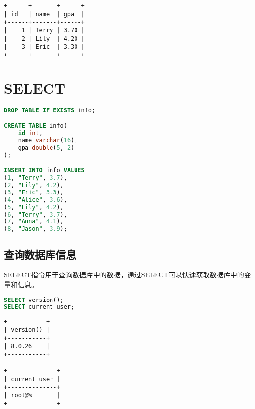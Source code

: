 \documentclass[12pt, openany, oneside]{book}
\begin{document}
\begin{tcolorbox}
	\begin{verbatim}
+------+-------+------+
| id   | name  | gpa  |
+------+-------+------+
|    1 | Terry | 3.70 |
|    2 | Lily  | 4.20 |
|    3 | Eric  | 3.30 |
+------+-------+------+
\end{verbatim}
\end{tcolorbox}

\newpage

\chapter{SELECT}

\vspace{0.5cm}


\begin{lstlisting}[language=SQL]
DROP TABLE IF EXISTS info;

CREATE TABLE info(
    id int,
    name varchar(16),
    gpa double(5, 2)
);

INSERT INTO info VALUES
(1, "Terry", 3.7),
(2, "Lily", 4.2),
(3, "Eric", 3.3),
(4, "Alice", 3.6),
(5, "Lily", 4.2),
(6, "Terry", 3.7),
(7, "Anna", 4.1),
(8, "Jason", 3.9);
\end{lstlisting}

\vspace{0.5cm}

\section{查询数据库信息}

SELECT指令用于查询数据库中的数据，通过SELECT可以快速获取数据库中的变量和信息。\\


\begin{lstlisting}[language=SQL]
SELECT version();
SELECT current_user;
\end{lstlisting}

\begin{tcolorbox}
	\begin{verbatim}
+-----------+
| version() |
+-----------+
| 8.0.26    |
+-----------+

+--------------+
| current_user |
+--------------+
| root@%       |
+--------------+
\end{verbatim}
\end{tcolorbox}
\end{document}
